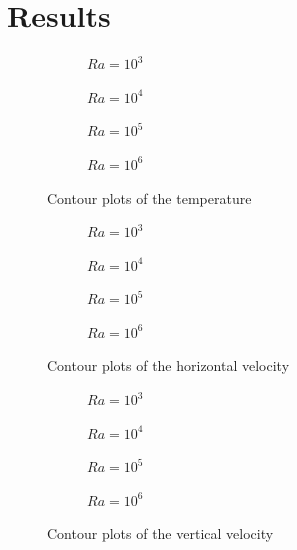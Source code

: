 \section{Results}
\begin{figure}[h]
	\centering
	\begin{subfigure}{0.5\textwidth}
		\resizebox{1.4\textwidth}{!}{}
		\caption{$Ra=10^{3}$}
	\end{subfigure}%
	\begin{subfigure}{0.5\textwidth}
		\resizebox{1.4\textwidth}{!}{}
		\caption{$Ra=10^{4}$}
	\end{subfigure}
	\begin{subfigure}{0.5\textwidth}
		\resizebox{1.4\textwidth}{!}{}
		\caption{$Ra=10^{5}$}
	\end{subfigure}%
	\begin{subfigure}{0.5\textwidth}
		\resizebox{1.4\textwidth}{!}{}
		\caption{$Ra=10^{6}$}
	\end{subfigure}
	\caption{Contour plots of the temperature}
\end{figure}
\begin{figure}[h]
	\centering
	\begin{subfigure}{0.5\textwidth}
		\resizebox{1.4\textwidth}{!}{}
		\caption{$Ra=10^{3}$}
	\end{subfigure}%
	\begin{subfigure}{0.5\textwidth}
		\resizebox{1.4\textwidth}{!}{}
		\caption{$Ra=10^{4}$}
	\end{subfigure}
	\begin{subfigure}{0.5\textwidth}
		\resizebox{1.4\textwidth}{!}{}
		\caption{$Ra=10^{5}$}
	\end{subfigure}%
	\begin{subfigure}{0.5\textwidth}
		\resizebox{1.4\textwidth}{!}{}
		\caption{$Ra=10^{6}$}
	\end{subfigure}
	\caption{Contour plots of the horizontal velocity}
\end{figure}
\begin{figure}[h]
	\centering
	\begin{subfigure}{0.5\textwidth}
		\resizebox{1.4\textwidth}{!}{}
		\caption{$Ra=10^{3}$}
	\end{subfigure}%
	\begin{subfigure}{0.5\textwidth}
		\resizebox{1.4\textwidth}{!}{}
		\caption{$Ra=10^{4}$}
	\end{subfigure}
	\begin{subfigure}{0.5\textwidth}
		\resizebox{1.4\textwidth}{!}{}
		\caption{$Ra=10^{5}$}
	\end{subfigure}%
	\begin{subfigure}{0.5\textwidth}
		\resizebox{1.4\textwidth}{!}{}
		\caption{$Ra=10^{6}$}
	\end{subfigure}
	\caption{Contour plots of the vertical velocity}
\end{figure}

